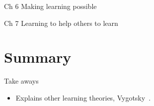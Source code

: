 \begin{frame}
  \begin{block}{Ch 6 Making learning possible}
  \end{block}
\end{frame}

\begin{frame}
  \begin{block}{Ch 7 Learning to help others to learn}
  \end{block}
\end{frame}

\section{Summary}

\begin{frame}
  \begin{block}{Take aways}
    \begin{itemize}
      \item Explains other learning theories, \eg Vygotsky~\cite{Vygotsky}.
    \end{itemize}
  \end{block}
\end{frame}
